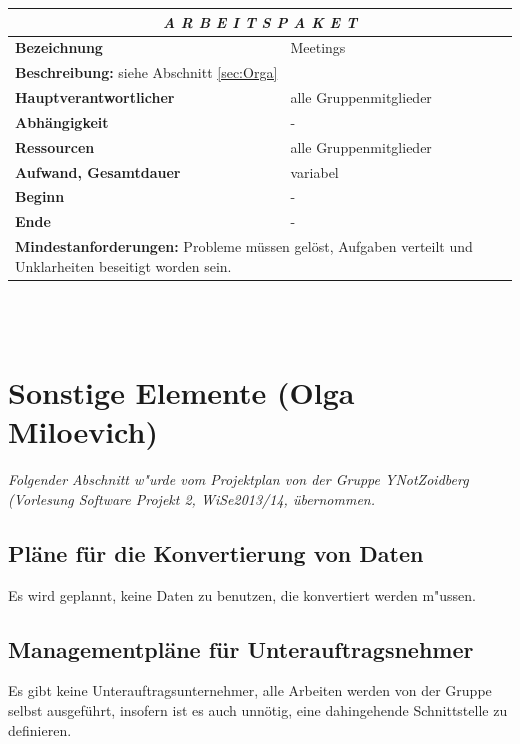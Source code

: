 \documentclass[fontsize=12pt,paper=a4,twoside]{scrartcl}
\begin{document}
\begin{tabular}{p{7.5cm}|p{7.5cm}}\toprule
\multicolumn{2}{c}{\textbf{\textit{A R B E I T S P A K E T \quad 8}}} \\ \toprule \hline
\textbf{Bezeichnung} & Meetings\\\hline
\multicolumn{2}{p{15cm}}{\textbf{Beschreibung:} \newline 
siehe Abschnitt \ref{sec:Orga}}  \\\hline
\textbf{Hauptverantwortlicher} & alle Gruppenmitglieder\\\hline
\textbf{Abhängigkeit} & -\\\hline
\textbf{Ressourcen} & alle Gruppenmitglieder\\\hline
\textbf{Aufwand, Gesamtdauer} & variabel  \\\hline
\textbf{Beginn} & - \\\hline
\textbf{Ende} & -\\\hline
\multicolumn{2}{p{15cm}}{\textbf{Mindestanforderungen: } Probleme müssen gelöst, Aufgaben verteilt und Unklarheiten beseitigt worden sein.  \newline
}  \\ \toprule
\end{tabular} \\\\ 


\section{Sonstige Elemente (Olga Miloevich)}



\textit{Folgender Abschnitt w"urde vom Projektplan von der Gruppe YNotZoidberg (Vorlesung Software Projekt 2, WiSe2013/14, übernommen.}\\

\subsection{Pläne für die Konvertierung von Daten}
Es wird geplannt, keine Daten zu benutzen, die konvertiert werden m"ussen.

\subsection{Managementpläne für Unterauftragsnehmer}
Es gibt keine Unterauftragsunternehmer, alle Arbeiten werden von der Gruppe selbst ausgeführt, insofern ist es auch unnötig, eine dahingehende Schnittstelle zu definieren.
\end{document}
